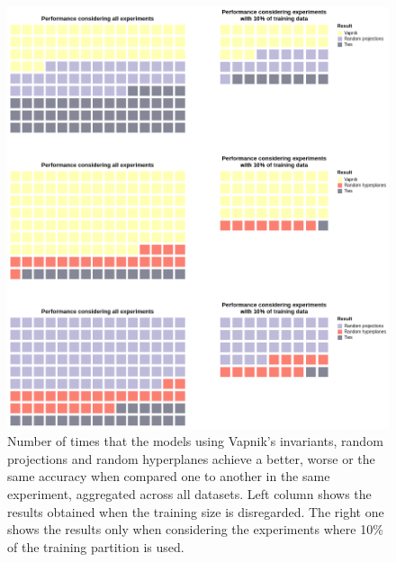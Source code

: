 \begin{figure}[ht]
    \centering
    \includegraphics[width=\textwidth]{thesis/Figures/invariants_performance_2.png}
    \caption{Number of times that the models using Vapnik's invariants, random projections and
    random hyperplanes achieve a better, worse or the same accuracy when compared one to another
    in the same experiment, aggregated across all datasets. Left column shows the results obtained when
    the training size is disregarded. The right one shows the results only when considering the experiments
    where 10\% of the training partition is used.}
    \label{fig:invariants_performance_2}
\end{figure}